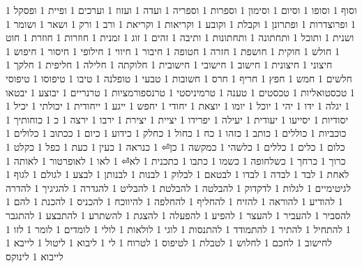       1 וסוף
      1 וסופו
      1 וסיום
      1 וסימון
      1 וספרות
      1 וספריה
      1 ועדה
      1 ועזוז
      1 וערכים
      1 ופיית
      1 ופסקל
      1 ופרוצדרות
      1 ופתרונן
      1 וקבלת
      1 וקובע
      1 וקריאות
      1 וקריאת
      1 ורב
      1 ורק
      1 ושאר
      1 ושומר
      1 ושנית
      1 ותוכל
      1 ותחתונה
      1 ותחתונות
      1 ותיבה
      1 זהים
      1 זוג
      1 זמנית
      1 חוזרות
      1 חוזרת
      1 חוט
      1 חולש
      1 חוקית
      1 חושפת
      1 חזרה
      1 חטופה
      1 חיבור
      1 חיווי
      1 חילופי
      1 חיסור
      1 חיפוש
      1 חיצוני
      1 חיצונית
      1 חישוב
      1 חישובי
      1 חישובית
      1 חלוקתה
      1 חלילה
      1 חליפית
      1 חלקך
      1 חלשים
      1 חמש
      1 חפץ
      1 חריף
      1 חרס
      1 חשובות
      1 טבעי
      1 טופלנה
      1 טיבו
      1 טיפוסו
      1 טיפוסי
      1 טכסטואליות
      1 טכסטים
      1 טענה
      1 טרמיניסטי
      1 טרנספורמציות
      1 טרנריים
      1 יבוצע
      1 יבטאו
      1 יגלה
      1 ידו
      1 יהי
      1 יוכל
      1 יומו
      1 יוצאת
      1 יחודי
      1 יחפש
      1 ייגע
      1 ייחודית
      1 יכולתי
      1 יכיל
      1 יסודיות
      1 יסייעו
      1 יעודית
      1 יעילה
      1 יפרידו
      1 יציית
      1 יצירת
      1 ירבו
      1 ירצה
      1 כ
      1 כוחותיך
      1 כוכביות
      1 כוללים
      1 כותב
      1 כזהו
      1 כח
      1 כחול
      1 כחלק
      1 כידוע
      1 כיום
      1 ככתוב
      1 כלולים
      1 כלום
      1 כלים
      1 כללים
      1 כלשהי
      1 כמקשה
      1 כן⏎
      1 כנראה
      1 כעין
      1 כעת
      1 כפל
      1 כקלט
      1 כרוך
      1 כרחך
      1 כשלחופה
      1 כשמו
      1 כתבו
      1 כתכנית
      1 לא⏎
      1 לאו
      1 לאופרטור
      1 לאותה
      1 לאחת
      1 לבד
      1 לבדה
      1 לבדו
      1 לבטאם
      1 לבלוק
      1 לבנות
      1 לבנותן
      1 לבצע
      1 לגולם
      1 לגוף
      1 לגיטימיים
      1 לגלות
      1 לדקדוק
      1 להבלטה
      1 להבלטת
      1 להבליט
      1 להגדרה
      1 להגיגיך
      1 להדרה
      1 להודיע
      1 להוראה
      1 להזיח
      1 להחליף
      1 להחלפה
      1 להיווכח
      1 להכניס
      1 להכנת
      1 להם
      1 להסביר
      1 להעביר
      1 להעצר
      1 להפיע
      1 להפעלה
      1 להצגת
      1 להשתרע
      1 להתבצע
      1 להתגבר
      1 להתחיל
      1 להתיר
      1 להתמודד
      1 להתנסות
      1 לוגי
      1 לולאות
      1 לולי
      1 לומדים
      1 לומר
      1 לזו
      1 לחישוב
      1 לחכם
      1 לחלוש
      1 לטבלת
      1 לטיפוס
      1 לטרוח
      1 לי
      1 ליבוא
      1 ליטול
      1 לייבא
      1 לייבוא
      1 לינוקס
